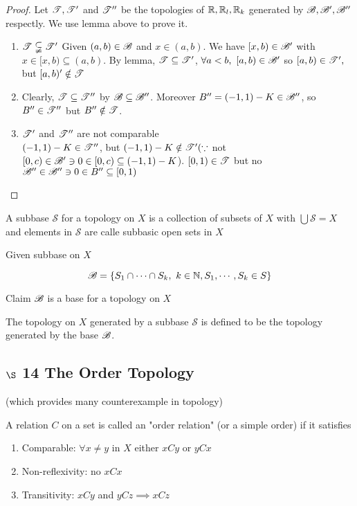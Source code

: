\begin{proof}
	Let $\mathscr{T},\mathscr{T}'$ and $\mathscr{T}''$ be the topologies of $\mathbb{R},\mathbb{R}_l,\mathbb{R}_k$ generated by $\mathscr{B},\mathscr{B}',\mathscr{B}''$ respectly. We use lemma above to prove it.
	\begin{enumerate}[label = $\star$]
		\item $\mathscr{T} \subsetneqq \mathscr{T}'$
		Given $(a,b) \in \mathscr{B}$ and $x \in (a,b)$. We have $[x,b) \in \mathscr{B}'$ with $x \in [x,b) \subseteq (a,b)$. By lemma, $\mathscr{T} \subseteq \mathscr{T}'$, $\forall a<b,~[a,b) \in \mathscr{B}'$ so $[a,b) \in \mathscr{T}',$ but $[a,b)' \notin \mathscr{T}$
		\item Clearly, $\mathscr{T} \subseteq \mathscr{T}''$ by $\mathscr{B} \subseteq \mathscr{B}''$. Moreover $B'' = (-1,1) - K \in \mathscr{B}''$, so $B'' \in \mathscr{T}''$ but $B'' \notin \mathscr{T}$.
		\item $\mathscr{T}'$ and $\mathscr{T}''$ are not comparable\\
		$(-1,1) - K \in \mathscr{T}''$, but $(-1,1) - K \notin \mathscr{T}'(\because$ not $[0,c) \in \mathscr{B}' \ni 0 \in [0,c) \subseteq (-1,1) - K$). $[0,1) \in \mathscr{T}$ but no $\mathscr{B}'' \in \mathscr{B}'' \ni 0 \in B'' \subseteq [0,1)$
	\end{enumerate} 
\end{proof}

\begin{defn}
	A subbase $\mathscr{S}$ for a topology on $X$ is a collection of subsets of $X$ with $\bigcup \mathscr{S} = X$ and elements in $\mathscr{S}$ are calle subbasic open sets in $X$
\end{defn}

Given subbase on $X$

$$\mathscr{B} = \{S_1 \cap \cdots \cap S_k,~k \in \mathbb{N},S_1,\cdots,S_k \in S\}$$

Claim $\mathscr{B}$ is a base for a topology on $X$

\begin{defn}
	The topology on $X$ generated by a subbase $\mathscr{S}$ is defined to be the topology generated by the base $\mathscr{B}$.
\end{defn}

\subsection*{$\S $ 14 The Order Topology}

(which provides many counterexample in topology)

\begin{defn}
	A relation $C$ on a set is called an "order relation"  (or a simple order) if it satisfies
	\begin{enumerate}
		\item Comparable: $\forall x \neq y$ in $X$ either $xCy$ or $yCx$
		\item Non-reflexivity: no $xCx$
		\item Transitivity: $xCy$ and $yCz \implies xCz$
	\end{enumerate}
\end{defn}

